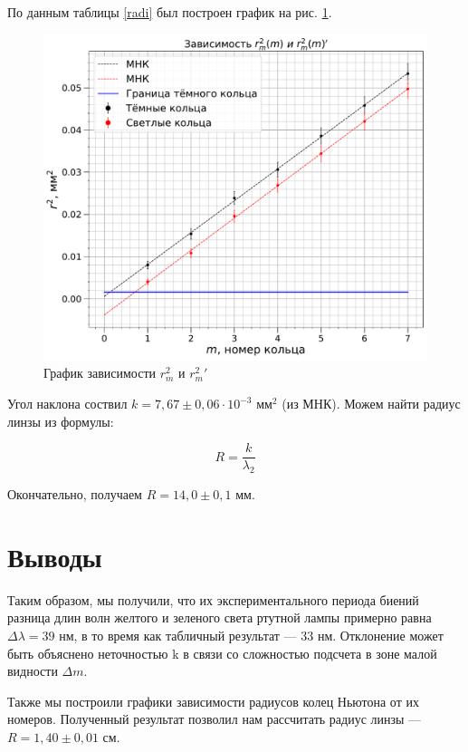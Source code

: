 \documentclass[a4paper,12pt]{article} %
\begin{document}
По данным таблицы \ref{radi} был построен график на рис. \ref{graph}. 

\begin{figure}[H]
    \centering
    \includegraphics[scale=0.65]{r2(m).pdf}
    \caption{График зависимости $r_m^2$ и $r_m^2'$}
    \label{graph}
\end{figure}

Угол наклона соствил $k =7,67 \pm 0,06 \cdot 10^{-3}$ мм$^2$ (из МНК). Можем найти радиус линзы из формулы:

\begin{equation}
    R = \frac{k}{\lambda_2}
\end{equation}

Окончательно, получаем $R = 14,0 \pm 0,1$ мм.

\section{Выводы}

Таким образом, мы получили, что их экспериментального периода биений разница длин волн  желтого и зеленого света ртутной лампы примерно равна $  \Delta \lambda = 39 \text{ нм} $, в то время как табличный результат --- 33 нм. Отклонение может быть объяснено неточностью k в связи со сложностью подсчета в зоне малой видности $ \Delta m $.
	
Также мы построили графики зависимости радиусов колец Ньютона от их номеров. Полученный результат позволил нам рассчитать радиус линзы ---  $ R = 1,40 \pm 0,01 \text{ см} $.
\end{document}
